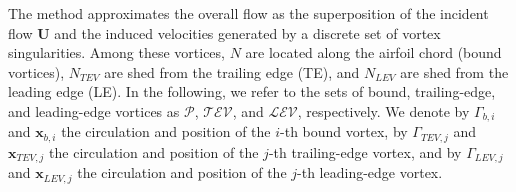 \documentclass[a4paper,12pt]{article}
\begin{document}
The method approximates the overall flow as the superposition of the incident flow \( \mathbf{U} \) and the induced velocities generated by a discrete set of vortex singularities.  
Among these vortices, \( N \) are located along the airfoil chord (bound vortices), \( N_{{TEV}} \) are shed from the trailing edge (TE), and \( N_{{LEV}} \) are shed from the leading edge (LE).  
In the following, we refer to the sets of bound, trailing-edge, and leading-edge vortices as \( \mathcal{P} \), \( \mathcal{TEV} \), and \( \mathcal{LEV} \), respectively.
We denote by \( \Gamma_{b,i} \) and \( \mathbf{x}_{b,i} \) the circulation and position of the \( i \)-th bound vortex,  
by \( \Gamma_{{TEV},j} \) and \( \mathbf{x}_{{TEV},j} \) the circulation and position of the \( j \)-th trailing-edge vortex,  
and by \( \Gamma_{{LEV},j} \) and \( \mathbf{x}_{{LEV},j} \) the circulation and position of the \( j \)-th leading-edge vortex.

\end{document}

